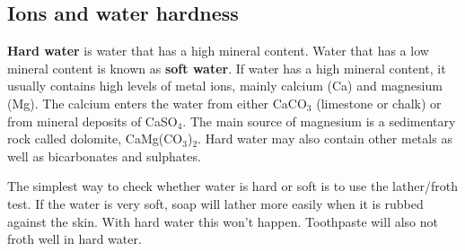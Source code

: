 
\subsection{Ions and water hardness}


\textbf{Hard water} is water that has a high mineral content. Water that has a low mineral content is known as \textbf{soft water}. If water has a high mineral content, it usually contains high levels of metal ions, mainly calcium (Ca) and magnesium (Mg). The calcium enters the water from either CaCO$_{3}$ (limestone or chalk) or from mineral deposits of CaSO$_{4}$. The main source of magnesium is a sedimentary rock called dolomite, CaMg(CO$_{3}$)$_{2}$. Hard water may also contain other metals as well as bicarbonates and sulphates. \\


\begin{IFact}{The simplest way to check whether water is hard or soft is to use the lather/froth test. If the water is very soft, soap will lather more easily when it is rubbed against the skin. With hard water this won't happen. Toothpaste will also not froth well in hard water.}
\end{IFact}

